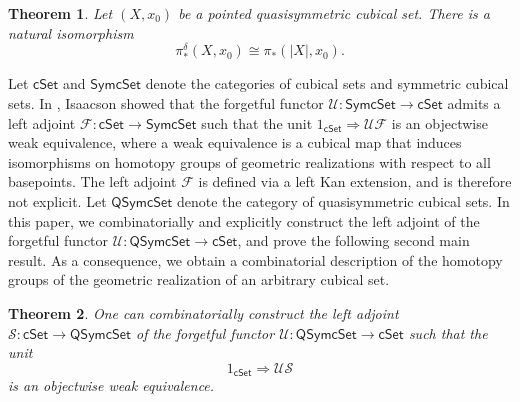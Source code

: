 \documentclass[oneside, 12pt]{amsart}
\numberwithin{equation}{section}
\theoremstyle{plain}
\newtheorem{theorem}{Theorem}[section]
\theoremstyle{definition}
\theoremstyle{remark}
\newcommand{\cSet}{\mathsf{cSet}}
\newcommand{\SymcSet}{\mathsf{SymcSet}}
\newcommand{\QSymcSet}{\mathsf{QSymcSet}}
\begin{document}
	\begin{theorem}
		\label{main 1}
		Let $(X,x_0)$ be a pointed quasisymmetric cubical set. There is a natural isomorphism
		\[
		\pi_*^\delta(X,x_0)\cong\pi_*(|X|,x_0).
		\]
	\end{theorem}
	
	
	Let $\cSet$ and $\SymcSet$ denote the categories of cubical sets and symmetric cubical sets. In \cite{I}, Isaacson showed that the forgetful functor $\mathcal{U}\colon\SymcSet\to\cSet$ admits a left adjoint $\mathcal{F}\colon\cSet\to\SymcSet$ such that the unit $1_\cSet\Rightarrow\mathcal{UF}$ is an objectwise weak equivalence, where a weak equivalence is a cubical map that induces isomorphisms on homotopy groups of geometric realizations with respect to all basepoints. The left adjoint $\mathcal{F}$ is defined via a left Kan extension, and is therefore not explicit. Let $\QSymcSet$ denote the category of quasisymmetric cubical sets. In this paper, we combinatorially and explicitly construct the left adjoint of the forgetful functor $\mathcal{U}\colon\QSymcSet\to\cSet$, and prove the following second main result. As a consequence, we obtain a combinatorial description of the homotopy groups of the geometric realization of an arbitrary cubical set.
	
	
	
	\begin{theorem}
		\label{main 2}
		One can combinatorially construct the left adjoint $\mathcal{S}\colon\cSet\to\QSymcSet$ of the forgetful functor $\mathcal{U}\colon\QSymcSet\to\cSet$ such that the unit
		\[
		1_{\cSet}\Rightarrow\mathcal{U}\mathcal{S}
		\]
		is an objectwise weak equivalence.
	\end{theorem}
	
\end{document}
